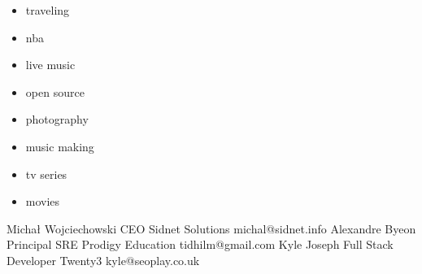 \documentclass[localFont,alternative,10pt]{yaac-another-awesome-cv}
\begin{document}
  \twocolumnsection
  {
    \begin{skills}
    \end{skills}}
  {
    \vspace{1em}
    \begin{multicols}{2}
      \begin{itemize}
        \item traveling
        \item nba
        \item live music
        \item open source
        \item photography
        \item music making
        \item tv series
        \item movies
      \end{itemize}
    \end{multicols}
  }

  \vspace{0.5em}

  \begin{referees}
      {Michał Wojciechowski}
      {CEO}
      {Sidnet Solutions}
      {michal@sidnet.info}
      {Alexandre Byeon}
      {Principal SRE}
      {Prodigy Education}
      {tidhilm@gmail.com}
      {Kyle Joseph}
      {Full Stack Developer}
      {Twenty3}
      {kyle@seoplay.co.uk}
  \end{referees}
\end{document}
